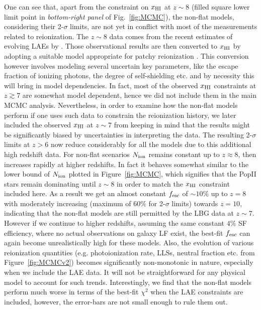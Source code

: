 \documentclass[useAMS,usenatbib]{mnras}
\begin{document}
One can see that, apart from the constraint on $x_{\rm HI}$ at $z\sim8$ (filled 
square lower limit point in {\it bottom-right panel} of Fig.~\ref{fig:MCMC}), 
the non-flat models, considering their 2-$\sigma$ limits, are not yet in 
conflict with most of the measurements related to reionization. The $z\sim8$
data comes from the recent estimates of evolving LAEs by \cite{2014ApJ...795...20S}. Those observational
results are then converted to $x_{\rm HI}$ by adopting a suitable model appropriate for patchy reionization
\citep{2007MNRAS.381...75M,2012ApJ...744..179S}. This conversion however involves modeling several
uncertain key parameters, like the escape fraction of 
ionizing photons, the degree of self-shielding etc. and by necessity this 
will bring in model dependencies. In fact, most of the observed $x_{\rm HI}$ 
constraints at $z\gtrsim7$ are somewhat model dependent, hence we 
did not include them in the main MCMC analysis.
Nevertheless, in order to examine how the non-flat models perform if one uses such
data to constrain the reionization history, we later included the observed
$x_{\rm HI}$ at $z\sim7$ from \cite{2018ApJ...856....2M} keeping in mind that
the results might be significantly biased by uncertainties in interpreting the data.
The resulting 2-$\sigma$ limits at $z>6$ now reduce considerably for all the
models due to this additional high redshift data. For non-flat scenarios
$N_{\rm ion}$ remains constant up to $z\approx8$, then increases rapidly
at higher redshifts. In fact it behaves somewhat similar to the lower
bound of $N_{\rm ion}$ plotted in Figure~\ref{fig:MCMC}, which signifies
that the PopII stars remain dominating until $z\sim8$ in order to match
the $x_{\rm HI}$ constraint included here. As a result we get an almost
constant $f_{\rm esc}$ of $\sim10\%$ up to $z=8$ with moderately increasing
(maximum of $60\%$ for 2-$\sigma$ limits) towards $z=10$, indicating that the non-flat
models are still permitted by the LBG data at $z\sim7$.
However if we continue to higher redshifts, assuming the same constant
$4\%$ SF efficiency, where no actual observations on galaxy LF exist,
the best-fit $f_{\rm esc}$ can again become unrealistically high
for these models. Also, the evolution of various reionization quantities
(e.g. photoionization rate, LLSs, neutral fraction etc. from Figure~\ref{fig:MCMCv2}) becomes significantly
non-monotonic in nature, especially when we include the LAE data. It will not be straightforward for
any physical model to account for such trends.
Interestingly, we find that the non-flat models perform much worse in terms of the
best-fit $\chi^2$ when the LAE constraints are included, however, the error-bars are
not small enough to rule them out.
\end{document}
